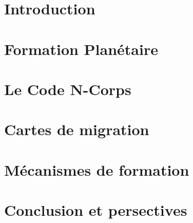 \documentclass[logos,chaptertoc]{bordeaux-thesis}
\begin{document}
\listoftables
\mtcaddchapter %

\newpage


\pagestyle{fancy}

\chapter*{Introduction}



\chapter{Formation Planétaire}\label{sec:chap1}


\chapter{Le Code N-Corps}\label{sec:code_n-corps}\label{sec:chap2}



\chapter{Cartes de migration}\label{sec:chap3}



\chapter{Mécanismes de formation}\label{sec:chap4}



\chapter{Conclusion et persectives}\label{sec:discussion}



\adjustmtc %
\end{document}
